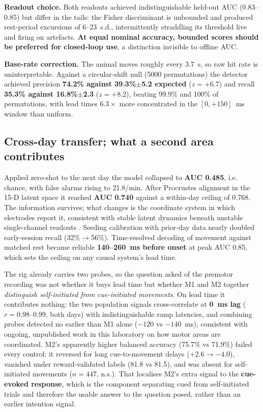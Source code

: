 \documentclass[10pt,twocolumn]{article}
\begin{document}
\textbf{Readout choice.} Both readouts achieved indistinguishable held-out AUC
(0.83--0.85) but differ in the tails: the Fisher discriminant is unbounded and
produced rest-period excursions of 6--23~s.d., intermittently straddling its
threshold live and firing on artefacts. \textbf{At equal nominal accuracy,
bounded scores should be preferred for closed-loop use}, a distinction invisible
to offline AUC.

\textbf{Base-rate correction.} The animal moves roughly every 3.7~s, so raw hit
rate is uninterpretable. Against a circular-shift null (5000 permutations) the
detector achieved precision \textbf{74.2\% against 39.3\%$\pm$5.2 expected}
($z=+6.7$) and recall \textbf{35.3\% against 16.8\%$\pm$2.3} ($z=+8.2$), beating
99.9\% and 100\% of permutations, with lead times $6.3\times$ more concentrated
in the $[0,+150]$~ms window than uniform.

\subsection{Cross-day transfer; what a second area contributes}

Applied zero-shot to the next day the model collapsed to \textbf{AUC 0.485},
i.e. chance, with false alarms rising to 21.8/min. After Procrustes alignment in
the 15-D latent space it reached \textbf{AUC 0.740} against a within-day ceiling
of 0.768. The information survives; what changes is the coordinate system in
which electrodes report it, consistent with stable latent dynamics beneath
unstable single-channel readouts \cite{gallego2020,degenhart2020}. Seeding
calibration with prior-day data nearly doubled early-session recall
(32\%$\to$56\%). Time-resolved decoding of movement against matched rest became
reliable \textbf{140--260~ms before onset} at peak AUC 0.85, which sets the
ceiling on any causal system's lead time.

The rig already carries two probes, so the question asked of the premotor
recording was not whether it buys lead time but whether M1 and M2 together
\emph{distinguish self-initiated from cue-initiated movements}. On lead time it
contributes nothing: the two population signals cross-correlate at \textbf{0~ms
lag} ($r=0.98$--0.99, both days) with indistinguishable ramp latencies, and
combining probes detected no earlier than M1 alone ($-120$ vs $-140$~ms), consistent with ongoing, unpublished work in
this laboratory on how motor areas are coordinated. M2's apparently higher
balanced accuracy (75.7\% vs 71.9\%) failed every control: it reversed for long
cue-to-movement delays ($+2.6\to-4.0$), vanished under reward-validated labels
(81.8 vs 81.5), and was absent for self-initiated movements ($n=447$, n.s.).
That localises M2's extra signal to the \textbf{cue-evoked response}, which is
the component separating cued from self-initiated trials and therefore the
usable answer to the question posed, rather than an earlier intention signal.
\end{document}
